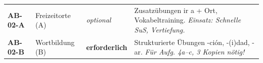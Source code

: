 \documentclass[11pt, a4paper]{article}
\begin{document}
\begin{tcolorbox}[
    colback=hellgrau,
    colframe=phase,
    title={\footnotesize\bfseries Arbeitsblätter},
    fonttitle=\bfseries,
    boxrule=0.5pt,
    top=2pt, bottom=2pt, left=4pt, right=4pt
]
\footnotesize
\begin{tabularx}{\textwidth}{@{}lp{3cm}lX@{}}
\textbf{AB-02-A} & Freizeitorte (A) & \textit{optional} & Zusatzübungen ir a + Ort, Vokabeltraining. \textit{Einsatz: Schnelle SuS, Vertiefung.} \\[0.2em]
\textbf{AB-02-B} & Wortbildung (B) & \textbf{erforderlich} & Strukturierte Übungen -ción, -(i)dad, -ar. \textit{Für Aufg. 4a--c, 3 Kopien nötig!} \\
\end{tabularx}
\end{tcolorbox}

\vspace{0.2cm}

\end{document}
